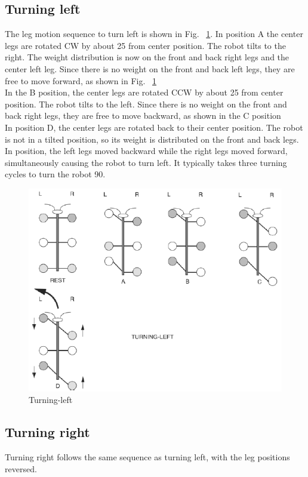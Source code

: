 \documentclass{report}
\begin{document}
\subsection{Turning left}
The leg motion sequence to turn left is shown in Fig. ~\ref{fig37}. In position A the center legs are rotated CW by
about 25 from center position. The robot tilts to the right. The weight distribution is now on the front and
back right legs and the center left leg. Since there is no weight on the front and back left legs, they are free
to move forward, as shown in Fig. ~\ref{fig37}\ \\
In the B position, the center legs are rotated CCW by about 25 from center position. The robot tilts to the
left. Since there is no weight on the front and back right legs, they are free to move backward, as shown in the
C position\\
In position D, the center legs are rotated back to their center position. The robot is not in a tilted position, so its weight is distributed on the front and back legs. In position, the left legs moved backward while
the right legs moved forward, simultaneously causing the robot to turn left. It typically takes three turning
cycles to turn the robot 90.\\
\begin{figure}[h!]
\centering
\includegraphics[width=\textwidth]{fig105}
\caption{Turning-left}
\label{fig37}
\end{figure}
\FloatBarrier
\subsection{Turning right}
Turning right follows the same sequence as turning left, with the leg positions reversed.\\
\end{document}

